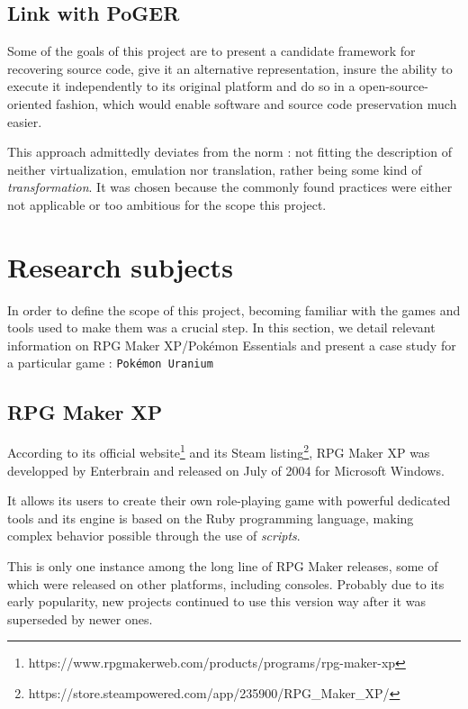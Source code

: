 \documentclass[11pt]{article}
\begin{document}
\subsection{Link with PoGER}

Some of the goals of this project are to present a candidate framework for recovering source code, give it an alternative representation, insure the ability to execute it independently to its original platform and do so in a open-source-oriented fashion, which would enable software and source code preservation much easier.

This approach admittedly deviates from the norm : not fitting the description of neither virtualization, emulation nor translation, rather being some kind of \textit{transformation}. It was chosen because the commonly found practices were either not applicable or too ambitious for the scope this project.







\newpage
\section{Research subjects}

In order to define the scope of this project, becoming familiar with the games and tools used to make them was a crucial step. In this section, we detail relevant information on RPG Maker XP/Pokémon Essentials and present a case study for a particular game : \texttt{Pokémon Uranium}


\subsection{RPG Maker XP}


According to its official website\footnote{https://www.rpgmakerweb.com/products/programs/rpg-maker-xp} and its Steam listing\footnote{https://store.steampowered.com/app/235900/RPG\_Maker\_XP/}, RPG Maker XP was developped by Enterbrain and released on July of 2004 for Microsoft Windows. 

It allows its users to create their own role-playing game with powerful dedicated tools and its engine is based on the Ruby programming language, making complex behavior possible through the use of \textit{scripts}.


This is only one instance among the long line of RPG Maker releases, some of which were released on other platforms, including consoles. Probably due to its early popularity, new projects continued to use this version way after it was superseded by newer ones.
\end{document}
